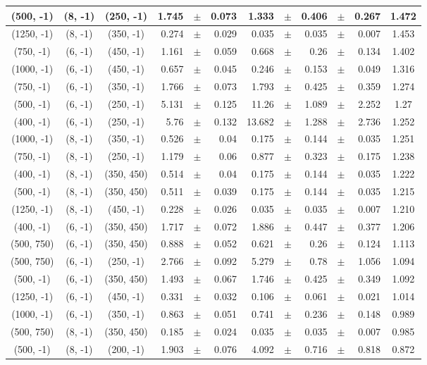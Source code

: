\documentclass[12pt]{paper}
\begin{document}
\begin{table}[ht]
\begin{center}
{\begin{tabular}{|c|c|c|rrr|rrrrr|c|}
(500, -1)&(8, -1)&(250, -1)&1.745&$\pm$&0.073&1.333&$\pm$&0.406&$\pm$&0.267&1.472\\\hline
(1250, -1)&(8, -1)&(350, -1)&0.274&$\pm$&0.029&0.035&$\pm$&0.035&$\pm$&0.007&1.453\\\hline
(750, -1)&(6, -1)&(450, -1)&1.161&$\pm$&0.059&0.668&$\pm$&0.26&$\pm$&0.134&1.402\\\hline
(1000, -1)&(6, -1)&(450, -1)&0.657&$\pm$&0.045&0.246&$\pm$&0.153&$\pm$&0.049&1.316\\\hline
(750, -1)&(6, -1)&(350, -1)&1.766&$\pm$&0.073&1.793&$\pm$&0.425&$\pm$&0.359&1.274\\\hline
(500, -1)&(6, -1)&(250, -1)&5.131&$\pm$&0.125&11.26&$\pm$&1.089&$\pm$&2.252&1.27\\\hline
(400, -1)&(6, -1)&(250, -1)&5.76&$\pm$&0.132&13.682&$\pm$&1.288&$\pm$&2.736&1.252\\\hline
(1000, -1)&(8, -1)&(350, -1)&0.526&$\pm$&0.04&0.175&$\pm$&0.144&$\pm$&0.035&1.251\\\hline
(750, -1)&(8, -1)&(250, -1)&1.179&$\pm$&0.06&0.877&$\pm$&0.323&$\pm$&0.175&1.238\\\hline
(400, -1)&(8, -1)&(350, 450)&0.514&$\pm$&0.04&0.175&$\pm$&0.144&$\pm$&0.035&1.222\\\hline
(500, -1)&(8, -1)&(350, 450)&0.511&$\pm$&0.039&0.175&$\pm$&0.144&$\pm$&0.035&1.215\\\hline
(1250, -1)&(8, -1)&(450, -1)&0.228&$\pm$&0.026&0.035&$\pm$&0.035&$\pm$&0.007&1.210\\\hline
(400, -1)&(6, -1)&(350, 450)&1.717&$\pm$&0.072&1.886&$\pm$&0.447&$\pm$&0.377&1.206\\\hline
(500, 750)&(6, -1)&(350, 450)&0.888&$\pm$&0.052&0.621&$\pm$&0.26&$\pm$&0.124&1.113\\\hline
(500, 750)&(6, -1)&(250, -1)&2.766&$\pm$&0.092&5.279&$\pm$&0.78&$\pm$&1.056&1.094\\\hline
(500, -1)&(6, -1)&(350, 450)&1.493&$\pm$&0.067&1.746&$\pm$&0.425&$\pm$&0.349&1.092\\\hline
(1250, -1)&(6, -1)&(450, -1)&0.331&$\pm$&0.032&0.106&$\pm$&0.061&$\pm$&0.021&1.014\\\hline
(1000, -1)&(6, -1)&(350, -1)&0.863&$\pm$&0.051&0.741&$\pm$&0.236&$\pm$&0.148&0.989\\\hline
(500, 750)&(8, -1)&(350, 450)&0.185&$\pm$&0.024&0.035&$\pm$&0.035&$\pm$&0.007&0.985\\\hline
(500, -1)&(8, -1)&(200, -1)&1.903&$\pm$&0.076&4.092&$\pm$&0.716&$\pm$&0.818&0.872\\\hline

\end{tabular}}
\end{center}
\end{table}
\end{document}
